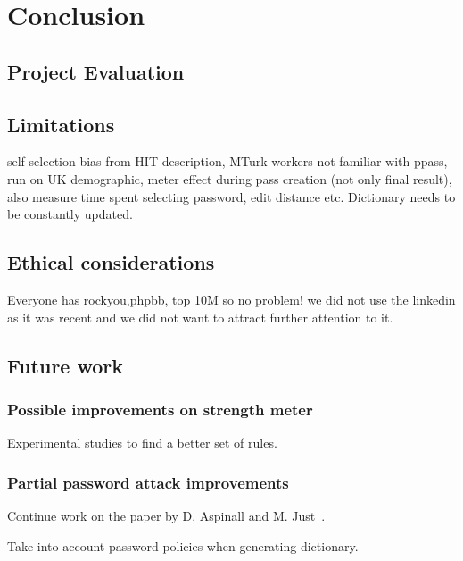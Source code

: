 
\chapter{Conclusion}
\label{cha:conclusion}

  \section{Project Evaluation}
    \label{sec:evaluation}

  \section{Limitations}
    \label{sec:limitations}
    self-selection bias from HIT description, MTurk workers not familiar with ppass, run on UK demographic, meter effect during pass creation (not only final result), also measure time spent selecting password, edit distance etc. Dictionary needs to be constantly updated.

  \section{Ethical considerations}
    \label{sec:ethical}
    Everyone has rockyou,phpbb, top 10M so no problem! we did not use the linkedin as it was recent and we did not want to attract further attention to it.

  \section{Future work}
    \label{sec:future_work}

    \subsection{Possible improvements on strength meter}
      \label{ssec:meter_improvements}
      Experimental studies to find a better set of rules.

    \subsection{Partial password attack improvements}
      \label{ssec:attack_improvements}
      Continue work on the paper by D. Aspinall and M. Just~\cite{part_pass}.

      Take into account password policies when generating dictionary.

